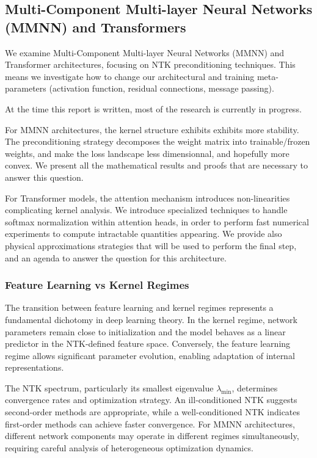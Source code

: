 \documentclass[a4paper]{article}
\theoremstyle{plain}
\theoremstyle{definition}
\theoremstyle{remark}
\begin{document}
\subsection{Multi-Component Multi-layer Neural Networks (MMNN) and Transformers}

We examine Multi-Component Multi-layer Neural Networks (MMNN) and Transformer architectures, focusing on NTK preconditioning techniques. This means we investigate how to change our architectural
and training meta-parameters (activation function, residual connections, message passing).

At the time this report is written, most of the research is currently in progress.

For MMNN architectures, the kernel structure exhibits exhibits more stability. The preconditioning strategy decomposes the weight matrix into trainable/frozen weights,
and make the loss landscape less dimensionnal, and hopefully more convex. We present all the mathematical results and proofs
that are necessary to answer this question.

For Transformer models, the attention mechanism introduces non-linearities complicating kernel analysis. 
We introduce specialized techniques to handle softmax normalization within attention heads, in order to perform fast numerical experiments to compute
intractable quantities appearing. We provide also physical approximations strategies that will be used to perform the final step, and an agenda
to answer the question for this architecture.

\subsubsection{Feature Learning vs Kernel Regimes}

The transition between feature learning and kernel regimes represents a fundamental dichotomy in deep learning theory. In the kernel regime, network parameters remain close to initialization and the model behaves as a linear predictor in the NTK-defined feature space. Conversely, the feature learning regime allows significant parameter evolution, enabling adaptation of internal representations.

The NTK spectrum, particularly its smallest eigenvalue $\lambda_{\min}$, determines convergence rates and optimization strategy. An ill-conditioned NTK suggests second-order methods are appropriate, while a well-conditioned NTK indicates first-order methods can achieve faster convergence. For MMNN architectures, different network components may operate in different regimes simultaneously, requiring careful analysis of heterogeneous optimization dynamics.
\end{document}
